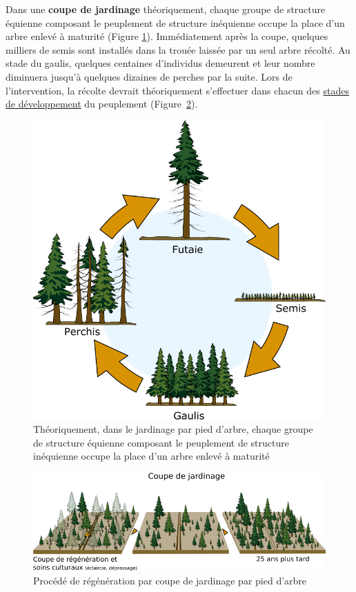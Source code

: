 Dans une \textbf{coupe de jardinage} théoriquement, chaque groupe de structure équienne composant le peuplement de structure inéquienne occupe la place d'un arbre enlevé à maturité (Figure \ref{fig:jardinage_pied}). Immédiatement après la coupe, quelques milliers de semis sont installés dans la trouée laissée par un seul arbre récolté. Au stade du gaulis, quelques centaines d'individus demeurent et leur nombre diminuera jusqu'à quelques dizaines de perches par la suite. Lors de l'intervention, la récolte devrait théoriquement s'effectuer dans chacun des \hyperref[developpement]{stades de développement} du peuplement (Figure~\ref{fig:jardinage}).
	
	\begin{figure}[!h]
		\centering
		\includegraphics[width=0.6\linewidth]{./img/ch8_jardinage_pied}
		\caption{Théoriquement, dans le jardinage par pied d'arbre, chaque groupe de structure équienne composant le peuplement de structure inéquienne occupe la place d'un arbre enlevé à maturité}
		\label{fig:jardinage_pied}
	\end{figure}
	
	\begin{figure}[!h]
		\centering
		\includegraphics[width=1\linewidth]{./img/ch8_jardinage}
		\caption{Procédé de régénération par coupe de jardinage par pied d'arbre}
		\label{fig:jardinage}
	\end{figure}	


